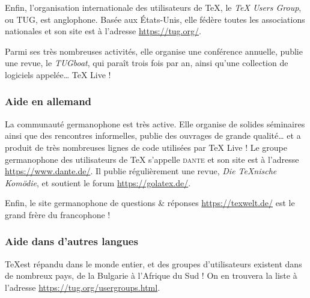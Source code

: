 \documentclass[german, english, french]{article}
\renewcommand{\TL}{\TeX{} Live\xspace}%
\newcommand\eng[1]{\foreignlanguage{english}{\emph{#1}}}
\begin{document}
Enfin, l'organisation internationale des utilisateurs de \TeX, le \eng{\TeX{}
  Users Group}, ou TUG, est anglophone. Basée aux États-Unis, elle fédère toutes
les associations nationales et son site est à l'adresse \url{https://tug.org/}.

Parmi ses très nombreuses activités, elle organise une conférence annuelle,
publie une revue, le \emph{TUGboat}, qui paraît trois fois par an, ainsi qu'une
collection de logiciels appelée\dots{} \TL{} !

\subsubsection{Aide en allemand}
La communauté germanophone est très active. Elle organise de solides séminaires
ainsi que des rencontres informelles, publie des ouvrages de grande
qualité\dots{} et a produit de très nombreuses lignes de code utilisées par
\TL{} ! Le groupe germanophone des utilisateurs de \TeX{} s'appelle
\textsc{dante} et son site est à l'adresse \url{https://www.dante.de/}. Il publie
régulièrement une revue, \emph{Die TeXnische Komödie}, et soutient le forum
\url{https://golatex.de/}.

Enfin, le site germanophone de questions \& réponses \url{https://texwelt.de/}
est le grand frère du francophone  !

\subsubsection{Aide dans d'autres langues}
\TeX est répandu dans le monde entier, et des groupes d'utilisateurs existent
dans de nombreux pays, de la Bulgarie à l'Afrique du Sud ! On en trouvera la
liste à l'adresse \url{https://tug.org/usergroups.html}.
\end{document}
